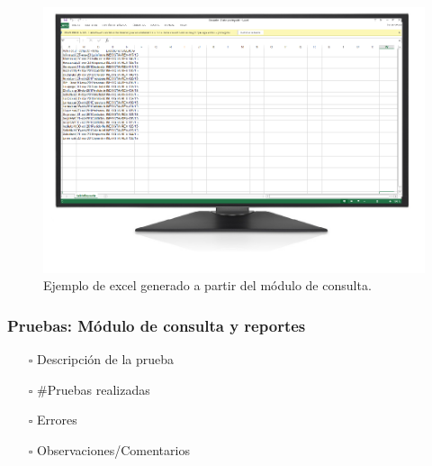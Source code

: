 \documentclass[../reportesINE.tex]{subfiles}
\begin{document}
\begin{itemize}
\begin{figure}[h]
  \centering
  \includegraphics[width=\linewidth]{ejemplo/ej6.png}
  \caption{Ejemplo de excel generado a partir del módulo de consulta.}
  \label{fig:ej6}
\end{figure}

\end{itemize}

\subsubsection{Pruebas: Módulo de consulta y reportes}

\begin{itemize}
\item[$\square$]  Descripción de la prueba
\item[$\square$]  #Pruebas realizadas
\item[$\square$]  Errores
\item[$\square$]  Observaciones/Comentarios
\end{itemize}
  
\end{document}
